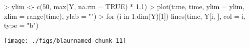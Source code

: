 \documentclass[a4paper,12pt]{article}\usepackage[]{graphicx}\usepackage[]{color}
\makeatletter
\def\maxwidth{ %
  \ifdim\Gin@nat@width>\linewidth
    \linewidth
  \else
    \Gin@nat@width
  \fi
}
\makeatother
\begin{document}
\begin{Schunk}
\begin{Sinput}
> ylim <- c(50, max(Y, na.rm = TRUE) * 1.1)
> plot(time, time, ylim = ylim, xlim = range(time), ylab = "")
> for (i in 1:dim(Y)[1]) lines(time, Y[i, ], col = i, type = "b")
\end{Sinput}

\texttt{[image: ./figs/blaunnamed-chunk-11]} \end{Schunk}


%
%

%

\clearpage
\end{document}
